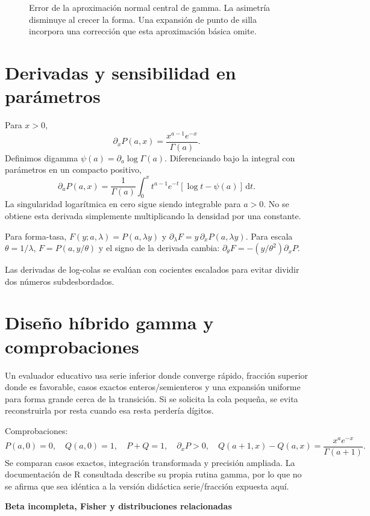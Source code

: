 \documentclass[11pt,a4paper]{article}
\newcommand{\dd}{\,\mathrm d}
\theoremstyle{definition}
\newcommand{\parte}[1]{\par\bigskip\Needspace{8\baselineskip}\begin{center}{\Large\bfseries\color{azul}#1}\end{center}}
\begin{document}
\begin{figure}[htbp]
\caption{Error de la aproximación normal central de gamma. La asimetría disminuye al crecer la forma. Una expansión de punto de silla incorpora una corrección que esta aproximación básica omite.}\label{fig:cdf-17}\end{figure}

\section{Derivadas y sensibilidad en parámetros}
Para $x>0$,
\[
\partial_xP(a,x)=\frac{x^{a-1}e^{-x}}{\Gamma(a)}.
\]
Definimos digamma $\psi(a)=\partial_a\log\Gamma(a)$. Diferenciando bajo la integral con parámetros en un compacto positivo,
\[
\partial_aP(a,x)=\frac1{\Gamma(a)}
\int_0^x t^{a-1}e^{-t}[\log t-\psi(a)]\dd t.
\]
La singularidad logarítmica en cero sigue siendo integrable para $a>0$. No se obtiene esta derivada simplemente multiplicando la densidad por una constante.

Para forma-tasa, $F(y;a,\lambda)=P(a,\lambda y)$ y
$\partial_\lambda F=y\,\partial_xP(a,\lambda y)$.
Para escala $\theta=1/\lambda$, $F=P(a,y/\theta)$ y el signo de la derivada cambia:
$\partial_\theta F=-(y/\theta^2)\partial_xP$.

Las derivadas de log-colas se evalúan con cocientes escalados para evitar dividir dos números subdesbordados.

\section{Diseño híbrido gamma y comprobaciones}
Un evaluador educativo usa serie inferior donde converge rápido, fracción superior donde es favorable, casos exactos enteros/semienteros y una expansión uniforme para forma grande cerca de la transición. Si se solicita la cola pequeña, se evita reconstruirla por resta cuando esa resta perdería dígitos.

Comprobaciones:
\[
P(a,0)=0,\quad Q(a,0)=1,\quad P+Q=1,\quad
\partial_xP>0,\quad
Q(a+1,x)-Q(a,x)=\frac{x^ae^{-x}}{\Gamma(a+1)}.
\]
Se comparan casos exactos, integración transformada y precisión ampliada. La documentación de R consultada describe su propia rutina gamma, por lo que no se afirma que sea idéntica a la versión didáctica serie/fracción expuesta aquí.



\parte{Beta incompleta, Fisher y distribuciones relacionadas}
\end{document}

